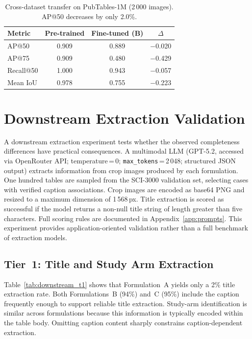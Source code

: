 \documentclass[pdflatex,sn-mathphys-num,iicol]{sn-jnl}
\begin{document}
\begin{table}[ht!]
\caption{Cross-dataset transfer on PubTables-1M (2\,000 images). AP@50 decreases by
only 2.0\%.}
\label{tab:transfer}
\footnotesize\setlength{\tabcolsep}{3pt}
\begin{tabular}{@{}lccc@{}}
\toprule
\textbf{Metric} & \textbf{Pre-trained} & \textbf{Fine-tuned (B)} & $\Delta$ \\
\midrule
AP@50 & 0.909 & 0.889 & $-$0.020 \\
AP@75 & 0.909 & 0.480 & $-$0.429 \\
Recall@50 & 1.000 & 0.943 & $-$0.057 \\
Mean IoU & 0.978 & 0.755 & $-$0.223 \\
\bottomrule
\end{tabular}
\end{table}

\section{Downstream Extraction Validation}\label{sec:downstream}

A downstream extraction experiment tests whether the observed completeness
differences have practical consequences. A multimodal LLM (GPT-5.2, accessed via
OpenRouter API; temperature\,=\,0; \texttt{max\_tokens}\,=\,2\,048;
structured JSON output) extracts information from crop images produced by each
formulation. One hundred tables are sampled from the SCI-3000 validation set,
selecting cases with verified caption associations. Crop images are encoded as
base64 PNG and resized to a maximum dimension of 1\,568\,px. Title extraction is
scored as successful if the model returns a non-null title string of length greater
than five characters. Full scoring rules are documented in
Appendix~\ref{app:prompts}. This experiment provides application-oriented
validation rather than a full benchmark of extraction models.

\subsection{Tier~1: Title and Study Arm Extraction}\label{sec:tier1}

Table~\ref{tab:downstream_t1} shows that Formulation~A yields only a 2\% title
extraction rate. Both Formulations~B (94\%) and~C (95\%) include the caption
frequently enough to support reliable title extraction. Study-arm identification is
similar across formulations because this information is typically encoded within the
table body. Omitting caption content sharply constrains caption-dependent extraction.
\end{document}
